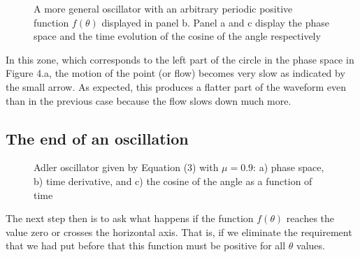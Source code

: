 \documentclass{article}
\begin{document}
\begin{figure}[h]
    \centering
    \caption{A more general oscillator with an arbitrary periodic positive function $f(\theta)$ displayed in panel b. Panel a and c display the 
    phase space and the time evolution of the cosine of the angle respectively} 
    \label{fig_adler3}
\end{figure}


In this zone, which corresponds to the left part of the circle in the phase space in Figure 4.a, the motion of the point (or flow) becomes very slow as indicated by the small arrow. 
As expected, this produces a flatter part of the waveform even than in the previous case because the flow slows down much more.




\subsection{The end of an oscillation}



\begin{figure}[h]
    \centering
    \caption{Adler oscillator given by Equation (3) with $\mu=0.9$: a) phase space, b) time derivative, and c) the cosine of the angle as a function of time} 
    \label{fig_adler4}
\end{figure}

The next step then is to ask what happens if the function $f(\theta)$ reaches the value zero or crosses the horizontal axis. That is, if we eliminate the requirement that we had put before that this function must be positive for all $\theta$ values. 
\end{document}
